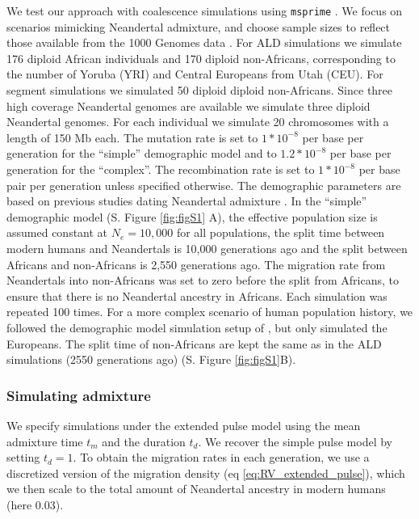 \documentclass[11pt]{article}
\begin{document}
We test our approach with coalescence simulations using  \texttt{msprime} 
\citep{kelleher_efficient_2016}. We focus on scenarios mimicking Neandertal admixture, and choose sample sizes to reflect those available from the 1000 Genomes data \citep{the_1000_genomes_project_consortium_global_2015}. For ALD simulations we simulate 176 diploid
African individuals and 170 diploid non-Africans, corresponding to the
number of Yoruba (YRI) and Central Europeans from Utah (CEU). For segment simulations we simulated 50 diploid diploid non-Africans.
Since three high coverage Neandertal genomes are available \citep{prufer_complete_2013,prufer_high-coverage_2017,mafessoni_high_coverage_2020} we  simulate three diploid Neandertal genomes. For each individual we simulate 20
chromosomes with a length of 150 Mb each. The mutation rate is set to
 \(1*10^{-8}\) per base per generation for the ``simple'' demographic model and to  \(1.2*10^{-8}\) per base per generation for the ``complex''. The
recombination rate is set to \(1*10^{-8}\) per base pair per generation
unless specified otherwise. The demographic parameters are based on
previous studies dating Neandertal admixture
\citep{sankararaman_date_2012,fu_genome_2014,moorjani_genetic_2016,skov_detecting_2018}. In
the ``simple'' demographic model (S. Figure  \ref{fig:figS1} A), the effective
population size is assumed constant at $N_e=10,000$ for all populations, the
split time between modern humans and Neandertals is 10,000 generations
ago and the split between Africans and non-Africans is 2,550
generations ago. The migration rate from Neandertals into non-Africans
was set to zero before the split from Africans, to ensure that there is no Neandertal
ancestry in Africans. Each simulation was repeated 100 times. For a more complex scenario of human population history, we followed the demographic model simulation setup of \cite{skov_detecting_2018}, but only simulated the Europeans. The split time of  non-Africans are kept the same as in the ALD simulations (2550 generations ago) (S. Figure \ref{fig:figS1}B).  


\subsubsection{Simulating admixture}\label{Simulating the expanded pulse}
We specify simulations under the extended pulse model using the mean admixture time $t_m$ and the duration $t_d$. We recover the simple pulse model by setting $t_d=1$. To obtain the migration rates in each generation, we use a discretized version of the migration density (eq \ref{eq:RV_extended_pulse}), which we then scale to the total amount of Neandertal ancestry in modern humans (here 0.03). 
\end{document}
